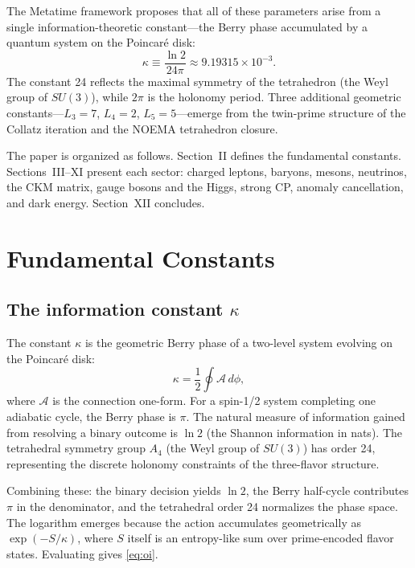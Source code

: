 \documentclass[aps,prd,reprint,twocolumn,showpacs,superscriptaddress]{revtex4-2}
\begin{document}
The Metatime framework proposes that all of these parameters arise from a
single information-theoretic constant---the Berry phase accumulated by a
quantum system on the Poincar\'{e} disk:
\begin{equation}
\kappa \equiv \frac{\ln 2}{24\pi} \approx 9.19315 \times 10^{-3}.
\label{eq:oi}
\end{equation}
The constant 24 reflects the maximal symmetry of the tetrahedron (the
Weyl group of $SU(3)$), while $2\pi$ is the holonomy period.  Three
additional geometric constants---$L_3 = 7$, $L_4 = 2$, $L_5 = 5$---emerge
from the twin-prime structure of the Collatz iteration and the NOEMA
tetrahedron closure.

The paper is organized as follows.  Section~II defines the fundamental
constants.  Sections~III--XI present each sector: charged leptons,
baryons, mesons, neutrinos, the CKM matrix, gauge bosons and the Higgs,
strong CP, anomaly cancellation, and dark energy.  Section~XII concludes.

\section{Fundamental Constants}
\label{sec:constants}

\subsection{The information constant $\kappa$}

The constant $\kappa$ is the geometric Berry phase of a two-level system
evolving on the Poincar\'{e} disk:
\begin{equation}
\kappa = \frac{1}{2} \oint \mathcal{A} \, d\phi,
\end{equation}
where $\mathcal{A}$ is the connection one-form.  For a spin-1/2 system
completing one adiabatic cycle, the Berry phase is $\pi$.  The natural
measure of information gained from resolving a binary outcome is
$\ln 2$ (the Shannon information in nats).  The tetrahedral symmetry
group $A_4$ (the Weyl group of $SU(3)$) has order 24, representing the
discrete holonomy constraints of the three-flavor structure.

Combining these: the binary decision yields $\ln 2$, the Berry half-cycle
contributes $\pi$ in the denominator, and the tetrahedral order 24
normalizes the phase space.  The logarithm emerges because the action
accumulates geometrically as $\exp(-S/\kappa)$, where $S$ itself is an
entropy-like sum over prime-encoded flavor states.  Evaluating gives
\eqref{eq:oi}.
\end{document}
